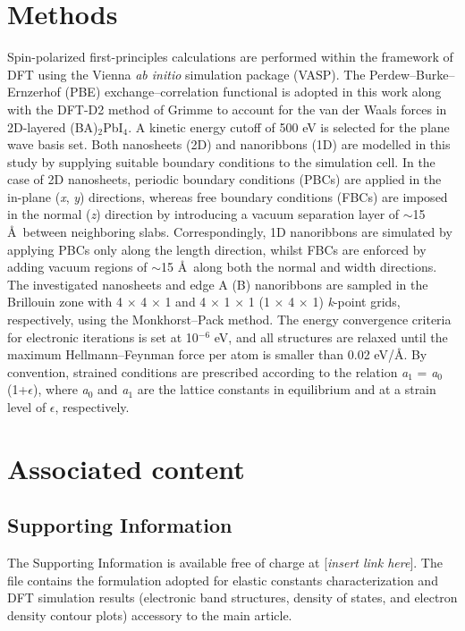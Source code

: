 \documentclass[aps,prl,preprint,11pt,superscriptaddress,bibnotes,amsmath,amssymb,amsfonts,showkeys]{revtex4-2}
\begin{document}
\section{Methods}
Spin-polarized first-principles calculations are performed within the framework of DFT \cite{KSexcorr65,SSdft11} using the Vienna \textit{ab initio} simulation package (VASP).\cite{KFvasp96} The Perdew--Burke--Ernzerhof (PBE) \cite{PBE96} exchange--correlation functional is adopted in this work along with the DFT-D2 method of Grimme \cite{DFTD206} to account for the van der Waals forces in 2D-layered (BA)$_2$PbI$_4$. A kinetic energy cutoff of 500 eV is selected for the plane wave basis set. Both nanosheets (2D) and nanoribbons (1D) are modelled in this study by supplying suitable boundary conditions to the simulation cell. In the case of 2D nanosheets, periodic boundary conditions (PBCs) are applied in the in-plane (\textit{x}, \textit{y}) directions, whereas free boundary conditions (FBCs) are imposed in the normal (\textit{z}) direction by introducing a vacuum separation layer of $\sim$15 \AA\ between neighboring slabs. Correspondingly, 1D nanoribbons are simulated by applying PBCs only along the length direction, whilst FBCs are enforced by adding vacuum regions of $\sim$15 \AA\ along both the normal and width directions. The investigated nanosheets and edge A (B) nanoribbons are sampled in the Brillouin zone with 4 $\times$ 4 $\times$ 1 and 4 $\times$ 1 $\times$ 1 (1 $\times$ 4 $\times$ 1) \textit{k}-point grids, respectively, using the Monkhorst--Pack method. The energy convergence criteria for electronic iterations is set at 10$^{-6}$ eV, and all structures are relaxed until the maximum Hellmann--Feynman force per atom is smaller than 0.02 eV/\AA. By convention, strained conditions are prescribed according to the relation \textit{a}$_1$ = \textit{a}$_0$(1+$\epsilon$), where \textit{a}$_0$ and \textit{a}$_1$ are the lattice constants in equilibrium and at a strain level of $\epsilon$, respectively.

\section{Associated content}
\subsection{Supporting Information}
The Supporting Information is available free of charge at [\textit{insert link here}]. The file contains the formulation adopted for elastic constants characterization and DFT simulation results (electronic band structures, density of states, and electron density contour plots) accessory to the main article.
\end{document}

